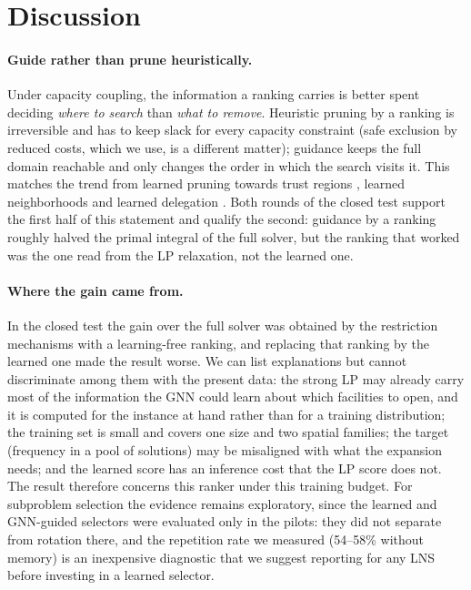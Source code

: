 \section{Discussion}\label{sec:discussion}

\paragraph{Guide rather than prune heuristically.}
Under capacity coupling, the information a ranking carries is better spent deciding \emph{where
to search} than \emph{what to remove}. Heuristic pruning by a ranking is irreversible and has to keep slack for every
capacity constraint (safe exclusion by reduced costs, which we use, is a different matter); guidance keeps the full domain reachable and only changes the order in which
the search visits it. This matches the trend from learned pruning towards trust regions
\citep{han2023}, learned neighborhoods \citep{huang2023} and learned delegation
\citep{li2021delegate}. Both rounds of the closed test support the first half of this statement and qualify the
second: guidance by a ranking roughly halved the primal integral of the full solver, but the
ranking that worked was the one read from the LP relaxation, not the learned one.

\paragraph{Where the gain came from.}
In the closed test the gain over the full solver was obtained by the restriction mechanisms with
a learning-free ranking, and replacing that ranking by the learned one made the result worse. We
can list explanations but cannot discriminate among them with the present data: the strong LP
may already carry most of the information the GNN could learn about which facilities to open,
and it is computed for the instance at hand rather than for a training distribution; the training
set is small and covers one size and two spatial families; the target (frequency in a pool of
solutions) may be misaligned with what the expansion needs; and the learned score has an
inference cost that the LP score does not. The result therefore concerns this ranker under this
training budget. For subproblem selection the evidence remains exploratory, since the learned and
GNN-guided selectors were evaluated only in the pilots: they did not separate from rotation
there, and the repetition rate we measured (54--58\% without memory) is an inexpensive diagnostic
that we suggest reporting for any LNS before investing in a learned selector.

